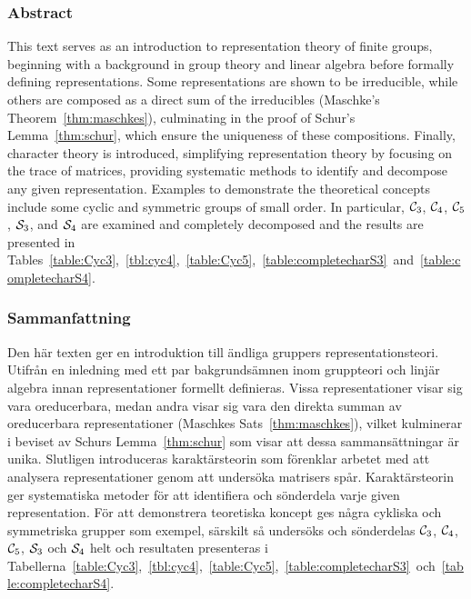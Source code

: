 \clearpage{\thispagestyle{empty}}
\begin{center}
	\subsubsection*{Abstract}
\end{center}

	This text serves as an introduction to representation theory of finite groups, beginning with a background in group theory and linear algebra before formally defining representations. Some representations are shown to be irreducible, while others are composed as a direct sum of the irreducibles (Maschke's Theorem~\ref{thm:maschkes}), culminating in the proof of Schur's Lemma~\ref{thm:schur}, which ensure the uniqueness of these compositions. Finally, character theory is introduced, simplifying representation theory by focusing on the trace of matrices, providing systematic methods to identify and decompose any given representation. Examples to demonstrate the theoretical concepts include some cyclic and symmetric groups of small order. In particular, $\mathcal{C}_3$, $\mathcal{C}_4$, $\mathcal{C}_5$, $\mathcal{S}_3$, and $\mathcal{S}_4$ are examined and completely decomposed and the results are presented in Tables~\ref{table:Cyc3},~\ref{tbl:cyc4},~\ref{table:Cyc5},~\ref{table:completecharS3}~and~\ref{table:completecharS4}.
		
\begin{center}
	\item\subsubsection*{Sammanfattning}
	
\end{center}

	Den här texten ger en introduktion till  ändliga gruppers representationsteori. Utifrån en inledning med ett par bakgrundsämnen inom gruppteori och linjär algebra innan representationer formellt definieras. Vissa representationer visar sig vara oreducerbara, medan andra visar sig vara den direkta summan av oreducerbara representationer (Maschkes Sats~\ref{thm:maschkes}), vilket kulminerar i beviset av  Schurs Lemma~\ref{thm:schur} som visar att dessa sammansättningar är unika. Slutligen introduceras karaktärsteorin som förenklar arbetet med att analysera representationer genom att undersöka matrisers spår. Karaktärsteorin ger systematiska metoder för att identifiera och sönderdela varje given representation. För att demonstrera teoretiska koncept ges några cykliska och symmetriska grupper som exempel, särskilt så undersöks och sönderdelas $\mathcal{C}_3$, $\mathcal{C}_4$, $\mathcal{C}_5$, $\mathcal{S}_3$ och $\mathcal{S}_4$ helt och resultaten presenteras i Tabellerna~\ref{table:Cyc3},~\ref{tbl:cyc4},~\ref{table:Cyc5},~\ref{table:completecharS3}~och~\ref{table:completecharS4}.
	
